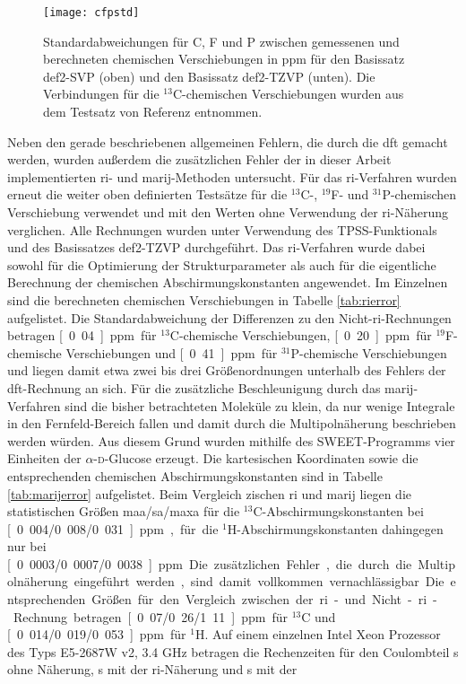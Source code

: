 \begin{figure}[ht!]
	\centering
	\texttt{[image: cfpstd]}
	\captionsetup{figurewithin = chapter}
	\captionsetup{font=small, labelfont=bf}\caption[Standardabweichungen für $^{13}$C-, $^{19}$F- und $^{31}$P-chemische Verschiebungen mit unterschiedliche Funktionalen und Basissätzen]{Standardabweichungen für C, F und P zwischen gemessenen und berechneten chemischen Verschiebungen in ppm für den Basissatz def2-SVP (oben) und den Basissatz def2-TZVP (unten). Die Verbindungen für die $^{13}$C-chemischen Verschiebungen wurden aus dem Testsatz von Referenz \cite{gauss1993effects} entnommen.} 
\label{abb:cfpshifts}
\end{figure}

\FloatBarrier
Neben den gerade beschriebenen allgemeinen Fehlern, die durch die \ac{dft} gemacht werden, wurden außerdem die zusätzlichen Fehler der in dieser Arbeit implementierten \ac{ri}- und \ac{marij}-Methoden untersucht. Für das \ac{ri}-Verfahren wurden erneut die weiter oben definierten Testsätze für die $^{13}$C-, $^{19}$F- und $^{31}$P-chemischen Verschiebung verwendet und mit den Werten ohne Verwendung der \ac{ri}-Näherung verglichen. Alle Rechnungen wurden unter Verwendung des TPSS-Funktionals und des Basissatzes def2-TZVP durchgeführt. Das \ac{ri}-Verfahren wurde dabei sowohl für die Optimierung der Strukturparameter als auch für die eigentliche Berechnung der chemischen Abschirmungskonstanten angewendet. Im Einzelnen sind die berechneten chemischen Verschiebungen in Tabelle \ref{tab:rierror} aufgelistet. Die Standardabweichung der Differenzen zu den Nicht-\ac{ri}-Rechnungen betragen \unit[0.04]{ppm} für $^{13}$C-chemische Verschiebungen, \unit[0.20]{ppm} für $^{19}$F-chemische Verschiebungen und \unit[0.41]{ppm} für $^{31}$P-chemische Verschiebungen und liegen damit etwa zwei bis drei Größenordnungen unterhalb des Fehlers der \ac{dft}-Rechnung an sich. Für die zusätzliche Beschleunigung durch das \ac{marij}-Verfahren sind die bisher betrachteten Moleküle zu klein, da nur wenige Integrale in den Fernfeld-Bereich fallen und damit durch die Multipolnäherung beschrieben werden würden. Aus diesem Grund wurden mithilfe des SWEET-Programms\supercite{bohne1999sweet} vier Einheiten der $\alpha$-\textsc{d}-Glucose erzeugt. Die kartesischen Koordinaten sowie die entsprechenden chemischen Abschirmungskonstanten sind in Tabelle \ref{tab:marijerror} aufgelistet. Beim Vergleich zischen \ac{ri} und \ac{marij} liegen die statistischen Größen \ac{maa}/\ac{sa}/\ac{maxa} für die $^{13}$C-Abschirmungskonstanten bei \unit[0.004/0.008/0.031]{ppm}, für die $^{1}$H-Abschirmungskonstanten dahingegen nur bei \unit[0.0003/0.0007/0.0038]{ppm}. Die zusätzlichen Fehler, die durch die Multipolnäherung eingeführt werden, sind damit vollkommen vernachlässigbar. Die entsprechenden Größen für den Vergleich zwischen der \ac{ri}- und Nicht-\ac{ri}-Rechnung betragen \unit[0.07/0.26/1.11]{ppm} für $^{13}$C und \unit[0.014/0.019/0.053]{ppm} für $^{1}$H. Auf einem einzelnen Intel\textsuperscript{\textregistered} Xeon\textsuperscript{\textregistered} Prozessor des Typs E5-2687W v2, 3.4 GHz betragen die Rechenzeiten für den Coulombteil \unit[4099]{s} ohne Näherung, \unit[220]{s} mit der \ac{ri}-Näherung und \unit[117]{s} mit der 